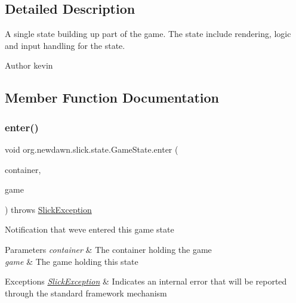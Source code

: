 \subsection{Detailed Description}
A single state building up part of the game. The state include rendering, logic and input handling for the state.

\begin{DoxyAuthor}{Author}
kevin 
\end{DoxyAuthor}


\subsection{Member Function Documentation}
\mbox{\label{interfaceorg_1_1newdawn_1_1slick_1_1state_1_1_game_state_ad5fc28eca9bed5ca50fffa9adf138884}} 
\subsubsection{\texorpdfstring{enter()}{enter()}}
{\footnotesize\ttfamily void org.\+newdawn.\+slick.\+state.\+Game\+State.\+enter (\begin{DoxyParamCaption}\item[{\mbox{\hyperlink{classorg_1_1newdawn_1_1slick_1_1_game_container}{Game\+Container}}}]{container,  }\item[{\mbox{\hyperlink{classorg_1_1newdawn_1_1slick_1_1state_1_1_state_based_game}{State\+Based\+Game}}}]{game }\end{DoxyParamCaption}) throws \mbox{\hyperlink{classorg_1_1newdawn_1_1slick_1_1_slick_exception}{Slick\+Exception}}}

Notification that we\textquotesingle{}ve entered this game state


\begin{DoxyParams}{Parameters}
{\em container} & The container holding the game \\
\hline
{\em game} & The game holding this state \\
\hline
\end{DoxyParams}

\begin{DoxyExceptions}{Exceptions}
{\em \mbox{\hyperlink{classorg_1_1newdawn_1_1slick_1_1_slick_exception}{Slick\+Exception}}} & Indicates an internal error that will be reported through the standard framework mechanism \\
\hline
\end{DoxyExceptions}


